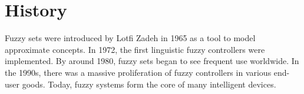 \section{History}

Fuzzy sets were introduced by Lotfi Zadeh in 1965 as a tool to model approximate concepts. 
In 1972, the first linguistic fuzzy controllers were implemented. 
By around 1980, fuzzy sets began to see frequent use worldwide. 
In the 1990s, there was a massive proliferation of fuzzy controllers in various end-user goods. 
Today, fuzzy systems form the core of many intelligent devices.